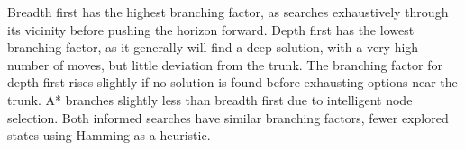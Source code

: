 \documentclass{article}
\begin{document}
Breadth first has the highest branching factor, as searches exhaustively through its vicinity before pushing the horizon forward.  Depth first has the lowest branching factor, as it generally will find a deep solution, with a very high number of moves, but little deviation from the trunk.  The branching factor for depth first rises slightly if no solution is found before exhausting options near the trunk.  A* branches slightly less than breadth first due to intelligent node selection.  Both informed searches have similar branching factors, fewer explored states using Hamming as a heuristic.

\noindent%
\begin{minipage}{\linewidth}
\label{visina8}
\end{minipage}

\noindent%
\begin{minipage}{\linewidth}
\label{visina8}
\end{minipage}
\end{document}

